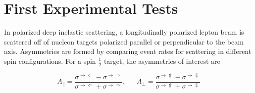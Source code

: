 \section{First Experimental Tests}

In polarized deep inelastic scattering, a longitudinally polarized lepton beam
is scattered off of nucleon targets polarized parallel or perpendicular to the
beam axis. Asymmetries are formed by comparing event rates for scattering in
different spin configurations. For a spin $\frac{1}{2}$ target, the
asymmetries of interest are


\begin{equation}
  A_{\parallel} = \frac{\sigma^{\rightarrow \Leftarrow} - \sigma^{\rightarrow \Rightarrow}}{\sigma^{\rightarrow \Leftarrow} + \sigma^{\rightarrow \Rightarrow}}, ~~~~~~~
  A_{\perp} = \frac{\sigma^{\rightarrow \Uparrow} - \sigma^{\rightarrow \Downarrow}}{\sigma^{\rightarrow \Uparrow} + \sigma^{\rightarrow \Downarrow}}
\end{equation}

